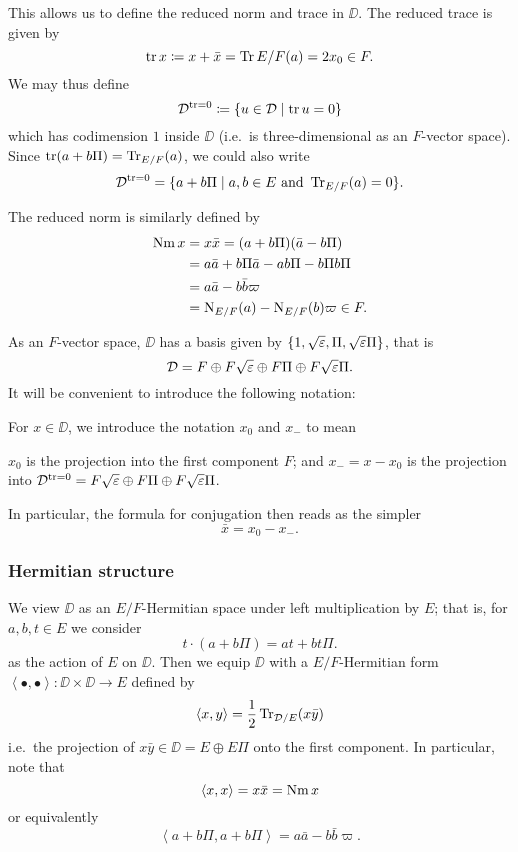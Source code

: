 This allows us to define the reduced norm and trace in $\DD$.
The reduced trace is given by
\[ \operatorname{tr} x \coloneqq x + \bar x = \operatorname{Tr}{E/F}(a) = 2x_0 \in F. \]
We may thus define
\[ \mathcal D^{\operatorname{tr} = 0} \coloneqq \left\{ u \in \mathcal D \mid \operatorname{tr} u = 0 \right\} \]
which has codimension $1$ inside $\DD$ (i.e.\ is three-dimensional as an $F$-vector space).
Since $\operatorname{tr}(a+b\Pi) = \operatorname{Tr}_{E/F}(a)$, we could also write
\[ \mathcal D^{\operatorname{tr} = 0} = \{ a+b\Pi \mid a,b \in E \text{ and } \operatorname{Tr}_{E/F}(a) = 0 \}. \]

The reduced norm is similarly defined by
\begin{align*}
  \operatorname{Nm} x &= x \bar x = (a + b \Pi)(\bar a - b \Pi) \\
  &= a \bar a + b \Pi \bar a - a b \Pi - b \Pi b \Pi \\
  &= a \bar a - b \bar b \varpi \\
  &= \operatorname{N}_{E/F}(a) - \operatorname{N}_{E/F}(b) \varpi \in F.
\end{align*}

As an $F$-vector space, $\DD$ has a basis given by
$\{1, \sqrt{\varepsilon}, \Pi, \sqrt{\varepsilon}\Pi\}$, that is
\[ \mathcal D = F \oplus F\sqrt{\varepsilon} \oplus F \Pi \oplus F\sqrt{\varepsilon}\Pi. \]
It will be convenient to introduce the following notation:
\begin{definition}
  [$x_0$ and $x_-$]
  For $x \in \DD$, we introduce the notation $x_0$ and $x_-$ to mean
  \begin{itemize}
    \ii $x_0$ is the projection into the first component $F$; and
    \ii $x_- = x - x_0$ is the projection into
    $\mathcal D^{\operatorname{tr} = 0} = F\sqrt{\varepsilon} \oplus F \Pi \oplus F\sqrt{\varepsilon}\Pi$.
  \end{itemize}
\end{definition}
In particular, the formula for conjugation then reads as the simpler
\[ \bar x = x_0 - x_-. \]

\subsubsection{Hermitian structure}
We view $\DD$ as an $E/F$-Hermitian space under left multiplication by $E$;
that is, for $a,b,t \in E$ we consider
\[ t \cdot (a + b \Pi) = a t + b t \Pi. \]
as the action of $E$ on $\DD$.
Then we equip $\DD$ with a $E/F$-Hermitian form
$\left\langle \bullet, \bullet \right\rangle \colon \DD \times \DD \to E$
defined by
\[ \left\langle x,y \right\rangle = \frac{1}{2} \operatorname{Tr}_{\mathcal D/E}(x \bar y) \]
i.e.\ the projection of $x \bar y \in \DD = E \oplus E\Pi$ onto the first component.
In particular, note that
\[ \left\langle x,x \right\rangle = x \bar{x} = \operatorname{Nm} x \]
or equivalently
\[ \left\langle a+b\Pi, a+b\Pi \right\rangle = a \bar a - b \bar b \varpi. \]

